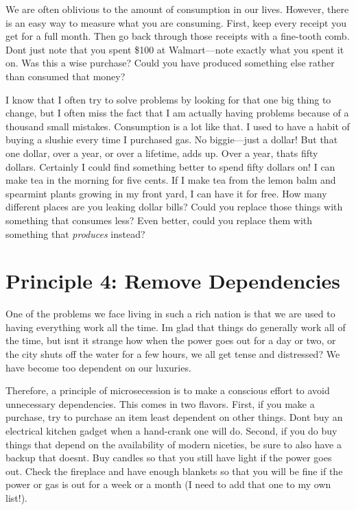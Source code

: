 \documentclass[letterpaper]{article}
\begin{document}
{\color{black}
We are often oblivious to the amount of consumption in our lives.
However, there is an easy way to measure what you are consuming. First,
keep every receipt you get for a full month. Then go back through those
receipts with a fine-tooth comb. Don{\textquotesingle}t just note that
you spent \$100 at Walmart—note exactly what you spent it on. Was this
a wise purchase? Could you have produced something else rather than
consumed that money?  }

{\color{black}
I know that I often try to solve problems by looking for that one big
thing to change, but I often miss the fact that I am actually having
problems because of a thousand small mistakes. Consumption is a lot
like that. I used to have a habit of buying a slushie every time I
purchased gas. No biggie—just a dollar!  But that one dollar, over a
year, or over a lifetime, adds up. Over a year, that{\textquotesingle}s
fifty dollars. Certainly I could find something better to spend fifty
dollars on!  I can make tea in the morning for five cents. If I make
tea from the lemon balm and spearmint plants growing in my front yard,
I can have it for free. How many different places are you leaking
\textcolor[rgb]{0.32941177,0.5529412,0.83137256}{dollar bills}?  Could
you replace \textcolor[rgb]{0.32941177,0.5529412,0.83137256}{those
things} with something that consumes less?  Even better, could you
replace \textcolor[rgb]{0.32941177,0.5529412,0.83137256}{them} with
something that \textit{produces} instead?}

\section[Principle 4: Remove Dependencies]{Principle 4: Remove
Dependencies}
{\color{black}
One of the problems we face living in such a rich nation is that we are
used to having everything work all the time. I{\textquotesingle}m glad
that things do generally work all of the time, but
isn{\textquotesingle}t it strange how when the power goes out for a day
or two, or the city shuts off the water for a few hours, we all get
tense and distressed? We have become too dependent on our luxuries.}

{\color{black}
Therefore, a principle of microsecession is to make a conscious effort
to avoid unnecessary dependencies. This comes in two flavors. First, if
you make a purchase, try to purchase an item least dependent on other
things. Don{\textquotesingle}t buy an electrical kitchen gadget when a
hand-crank one will do. Second, if you do buy things that depend on the
availability of modern niceties, be sure to also have a backup that
doesn{\textquotesingle}t. Buy candles so that you still have light if
the power goes out. Check the fireplace and have enough blankets so
that you will be fine if the power or gas is out for a week or a month
(I need to add that one to my own list!).}
\end{document}
